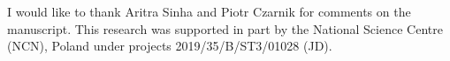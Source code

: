 \documentclass[prb,twocolumn,showkeys,showpacs,amsmath,amsfonts,floatfix,superscriptaddress,nofootinbib]{revtex4-1}
\begin{document}
\acknowledgements
%
I would like to thank Aritra Sinha and Piotr Czarnik for comments on the manuscript.
%
This research was supported in part by the National Science Centre (NCN), Poland 
under projects 2019/35/B/ST3/01028 (JD).
%
\appendix
 

\end{document}

